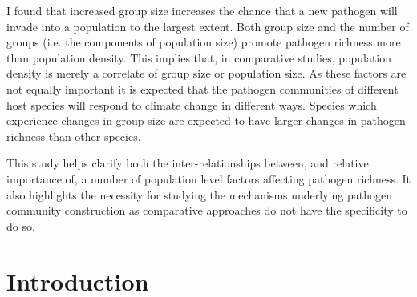 


I found that increased group size increases the chance that a new pathogen will invade into a population to the largest extent.
Both group size and the number of groups (i.e. the components of population size) promote pathogen richness more than population density.
This implies that, in comparative studies, population density is merely a correlate of group size or population size.
As these factors are not equally important it is expected that the pathogen communities of different host species will respond to climate change in different ways.
Species which experience changes in group size are expected to have larger changes in pathogen richness than other species.



This study helps clarify both the inter-relationships between, and relative importance of, a number of population level factors affecting pathogen richness. 
It also highlights the necessity for studying the mechanisms underlying pathogen community construction as comparative approaches do not have the specificity to do so.





\section{Introduction}






